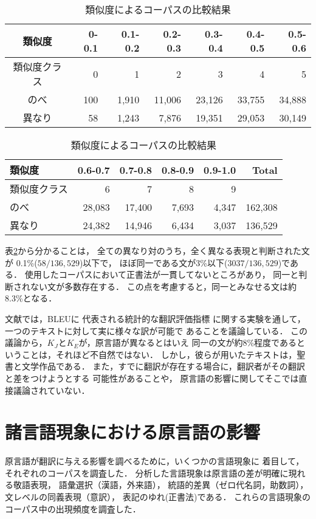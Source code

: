 \begin{table}[htb]
\caption{類似度によるコーパスの比較結果}
\label{tab:sim}
\begin{center}
\begin{tabular}{c|rrrrrr}
\hline    \hline
類似度 
& 0-0.1
& 0.1-0.2 
& 0.2-0.3 
& 0.3-0.4 
& 0.4-0.5 
& 0.5-0.6 
\\
\hline
類似度クラス & 0 & 1 & 2 & 3 & 4 & 5 \\
\hline
のべ
& 100 
& 1,910 
& 11,006
& 23,126 
& 33,755 
& 34,888 
\\
\hline
異なり
& 58 
& 1,243 
& 7,876 
& 19,351 
& 29,053
& 30,149 
\\
\hline
\end{tabular}
\vspace*{1mm}
 
\begin{tabular}{l|rrrrr}
\hline
類似度 
& 0.6-0.7 
& 0.7-0.8 
& 0.8-0.9 
& 0.9-1.0 
& Total
\\
\hline
類似度クラス & 6 & 7 & 8 & 9 \\ \hline
のべ
& 28,083 
& 17,400 
& 7,693 
& 4,347  
& 162,308
\\ \hline
異なり
& 24,382  
& 14,946 
& 6,434 
& 3,037 
& 136,529
\\ \hline\hline
\end{tabular}
\end{center}
\end{table}

表\ref{tab:sim}から分かることは，
全ての異なり対のうち，全く異なる表現と判断された文が
0.1\%($58/136,529$)以下で，
ほぼ同一である文が3\%以下($3037/136,529$)である．
使用したコーパスにおいて正書法が一貫してないところがあり，
同一と判断されない文が多数存在する．
この点を考慮すると，同一とみなせる文は約8.3\%となる．

文献\cite{Culy:Riehemann:2003}では，BLEU\cite{Papineni2001}に
代表される統計的な翻訳評価指標
に関する実験を通して，一つのテキストに対して実に様々な訳が可能で
あることを議論している．
この議論から，$K_J$と$K_E$が，原言語が異なるとはいえ
同一の文が約8\%程度であるということは，それほど不自然ではない．
しかし，彼らが用いたテキストは，聖書と文学作品である．
また，すでに翻訳が存在する場合に，翻訳者がその翻訳と差をつけようとする
可能性があることや，
原言語の影響に関してそこでは直接議論されていない．

\section{諸言語現象における原言語の影響}
\label{sec:ling}
原言語が翻訳に与える影響を調べるために，いくつかの言語現象に
着目して，それぞれのコーパスを調査した．
分析した言語現象は原言語の差が明確に現れる敬語表現，
語彙選択（漢語，外来語），
統語的差異（ゼロ代名詞，助数詞），文レベルの同義表現（意訳），
表記のゆれ(正書法)である．
これらの言語現象のコーパス中の出現頻度を調査した．

